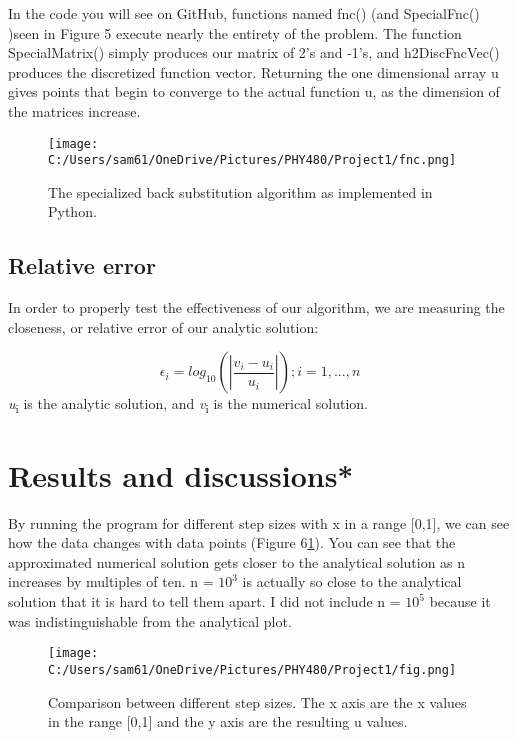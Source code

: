 \documentclass[10pt,showpacs,preprintnumbers,footinbib,amsmath,amssymb,aps,prl,twocolumn,groupedaddress,superscriptaddress,showkeys]{revtex4-1}
\begin{document}
In the code you will see on GitHub, functions named fnc() (and SpecialFnc() )seen in Figure 5 execute nearly the entirety of the problem. The function SpecialMatrix() simply produces our matrix of 2's and -1's, and h2DiscFncVec() produces the discretized function vector. Returning the one dimensional array u gives points that begin to converge to the actual function u, as the dimension of the matrices increase.

\begin{figure}[!ht]
	\centering
	\texttt{[image: C:/Users/sam61/OneDrive/Pictures/PHY480/Project1/fnc.png]}
	\caption{ The specialized back substitution algorithm as implemented in Python.  }
\end{figure}

	\subsection{Relative error}
In order to properly test the effectiveness of our algorithm, we are measuring the closeness, or relative error of our analytic solution:

	\begin{equation}
	\epsilon_{i} = log_{10}(|\frac{v_{i}-u_{i}}{u_{i}}|)  ; i = 1,...,n
	\label{error}
	\end{equation}
{\it u}\textsubscript{i} is the analytic solution, and {\it v}\textsubscript{i} is the numerical solution.

\section{Results and discussions*}

  By running the program for different step sizes with x in a range [0,1], we can see how the data changes with data points (Figure 6\ref{uvx}). You can see that the approximated numerical solution gets closer to the analytical solution as n increases by multiples of ten. n = $10^{3}$ is actually so close to the analytical solution that it is hard to tell them apart. I did not include n = $10^{5}$ because it was indistinguishable from the analytical plot. 

\begin{figure}[!ht]
	\centering
	\texttt{[image: C:/Users/sam61/OneDrive/Pictures/PHY480/Project1/fig.png]}
	\label{uvx}
	\caption{Comparison between different step sizes.  The x axis are the x values in the range [0,1] and the y axis are the resulting u values.}
\end{figure}
\end{document}
